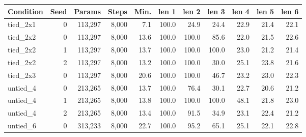 \begin{tabular}{@{}lrrrrrrrrrr@{}}
\toprule
Condition & Seed & Params & Steps & Min. & len 1 & len 2 & len 3 & len 4 & len 5 & len 6 \\
\midrule
tied\_2x1 & 0 & 113{,}297 & 8{,}000 & 7.1 & 100.0 & 24.9 & 24.4 & 22.9 & 21.4 & 22.1 \\
tied\_2x2 & 0 & 113{,}297 & 8{,}000 & 13.6 & 100.0 & 100.0 & 85.6 & 22.0 & 21.5 & 22.6 \\
tied\_2x2 & 1 & 113{,}297 & 8{,}000 & 13.7 & 100.0 & 100.0 & 100.0 & 23.0 & 21.2 & 21.4 \\
tied\_2x2 & 2 & 113{,}297 & 8{,}000 & 13.2 & 100.0 & 100.0 & 30.0 & 25.1 & 23.8 & 21.6 \\
tied\_2x3 & 0 & 113{,}297 & 8{,}000 & 20.6 & 100.0 & 100.0 & 46.7 & 23.2 & 23.0 & 22.3 \\
untied\_4 & 0 & 213{,}265 & 8{,}000 & 13.7 & 100.0 & 76.4 & 30.1 & 22.7 & 20.6 & 21.2 \\
untied\_4 & 1 & 213{,}265 & 8{,}000 & 13.8 & 100.0 & 100.0 & 100.0 & 48.1 & 21.8 & 23.0 \\
untied\_4 & 2 & 213{,}265 & 8{,}000 & 13.4 & 100.0 & 91.5 & 34.9 & 23.1 & 22.4 & 21.2 \\
untied\_6 & 0 & 313{,}233 & 8{,}000 & 22.7 & 100.0 & 95.2 & 65.1 & 25.1 & 22.1 & 22.8 \\
\bottomrule
\end{tabular}
